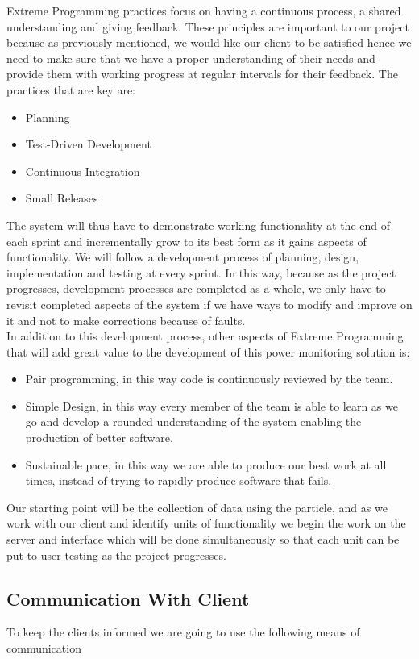 \documentclass[a4paper,12pt]{article}
\begin{document}
Extreme Programming practices focus on having a continuous process, a shared understanding and giving feedback. These principles are important to our project because as previously mentioned, we would like our client to be satisfied hence we need to make sure that we have a proper understanding of their needs and provide them with working progress at regular intervals for their feedback. The practices that are key are:
\begin{itemize}
\item Planning
\item Test-Driven Development
\item Continuous Integration
\item Small Releases
\end{itemize}
The system will thus have to demonstrate working functionality at the end of each sprint and incrementally grow to its best form as it gains aspects of functionality. We will follow a development process of planning, design, implementation and testing at every sprint. In this way, because as the project progresses, development processes are completed as a whole, we only have to revisit completed aspects of the system if we have ways to modify and improve on it and not to make corrections because of faults.\\

In addition to this development process, other aspects of Extreme Programming that will add great value to the development of this power monitoring solution is:
\begin{itemize}
\item Pair programming, in this way code is continuously reviewed by the team.
\item Simple Design, in this way every member of the team is able to learn as we go and develop a rounded understanding of the system enabling the production of better software.
\item Sustainable pace, in this way we are able to produce our best work at all times, instead of trying to rapidly produce software that fails.
\end{itemize}
Our starting point will be the collection of data using the particle, and as we work with our client and identify units of functionality we begin the work on the server and interface which will be done simultaneously so that each unit can be put to user testing as the project progresses.
\subsection{Communication With Client}
To keep the clients informed we are going to use the following means of communication
\end{document}
